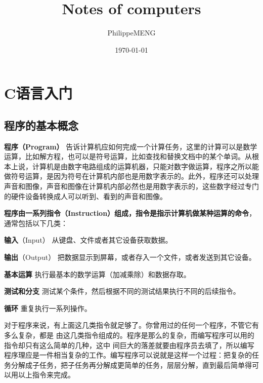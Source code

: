 \documentclass[12pt]{book}
\title{Notes of computers}
\author{PhilippeMENG}
\date{\today}
\begin{document}
	
\maketitle
\tableofcontents
\chapter{C语言入门}
\section{程序的基本概念}

\textbf{程序（Program）}
告诉计算机应如何完成一个计算任务，这里的计算可以是数学运算，比如解方程，也可以是符号运算，比如查找和替换文档中的某个单词。从根本上说，计算机是由数字电路组成的运算机器，只能对数字做运算，程序之所以能做符号运算，是因为符号在计算机内部也是用数字表示的。此外，程序还可以处理声音和图像，声音和图像在计算机内部必然也是用数字表示的，这些数字经过专门的硬件设备转换成人可以听到、看到的声音和图像。

\textbf{程序由一系列指令（Instruction）组成，指令是指示计算机做某种运算的命令}，通常包括以下几类：

\textbf{输入}（Input） 从键盘、文件或者其它设备获取数据。

\textbf{输出}（Output）
把数据显示到屏幕，或者存入一个文件，或者发送到其它设备。

\textbf{基本运算} 执行最基本的数学运算（加减乘除）和数据存取。

\textbf{测试和分支}
测试某个条件，然后根据不同的测试结果执行不同的后续指令。

\textbf{循环} 重复执行一系列操作。

对于程序来说，有上面这几类指令就足够了。你曾用过的任何一个程序，不管它有多么复杂，都是
由这几类指令组成的。程序是那么的复杂，而编写程序可以用的指令却只有这么简单的几种，这中
间巨大的落差就要由程序员去填了，所以编写程序理应是一件相当复杂的工作。编写程序可以说就是这样一个过程：把复杂的任务分解成子任务，把子任务再分解成更简单的任务，层层分解，直到最后简单得可以用以上指令来完成。
\end{document}
